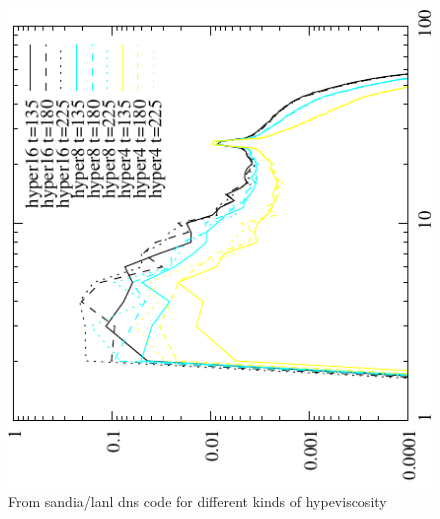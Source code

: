 \documentclass[12pt]{article}
\begin{document}
\begin{figure}
\begin{center}
\includegraphics[angle=-90,width=6.in]{r16ketime}
\caption{From sandia/lanl dns code for different kinds of hypeviscosity}
\label{fig:r16ketime}
\end{center}
\end{figure}
\end{document}
